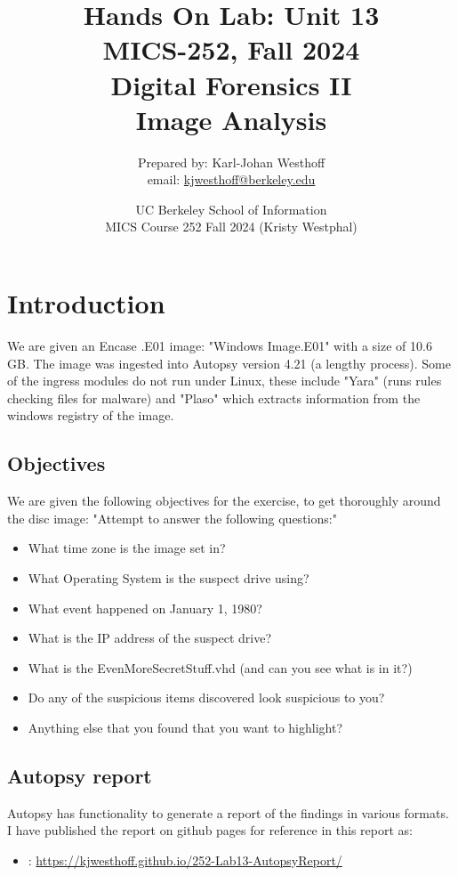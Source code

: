 \documentclass[
	letterpaper, %
	10pt, %
	unnumberedsections, %
	twoside, %
]{APAAssignment}
\title{Hands On Lab: Unit 13 \\ MICS-252, Fall 2024 \\ Digital Forensics II \\ Image Analysis}
\date{UC Berkeley School of Information \\
MICS Course 252 Fall 2024 (Kristy Westphal)
}
\author{
	Prepared by: Karl-Johan Westhoff \\
	email: \href{mailto:kjwesthoff@berkeley.edu}{kjwesthoff@berkeley.edu}
}
\begin{document}
\onecolumn
\maketitle %


\section{Introduction}
We are given an Encase .E01 image: "Windows Image.E01" with a size of 10.6 GB. The image was ingested into Autopsy version 4.21 (a lengthy process). Some of the ingress modules do not run under Linux, these include "Yara" (runs rules checking files for malware) and "Plaso" which extracts information from the windows registry
of the image.

\subsection{Objectives}
We are given the following objectives for the exercise, to get thoroughly around the disc image:
"Attempt to answer the following questions:"
\begin{itemize}
	\item What time zone is the image set in?
	\item What Operating System is the suspect drive using?
	\item What event happened on January 1, 1980?
	\item What is the IP address of the suspect drive?
	\item What is the EvenMoreSecretStuff.vhd (and can you see what is in it?)
	\item Do any of the suspicious items discovered look suspicious to you?
	\item Anything else that you found that you want to highlight?
\end{itemize}

\subsection{Autopsy report}
Autopsy has functionality to generate a report of the findings in various formats. I have published the report on github pages for reference in this report as:
\begin{itemize}
	\item	\cite{AutoReport}: \url{https://kjwesthoff.github.io/252-Lab13-AutopsyReport/}
\end{itemize}
\end{document}

